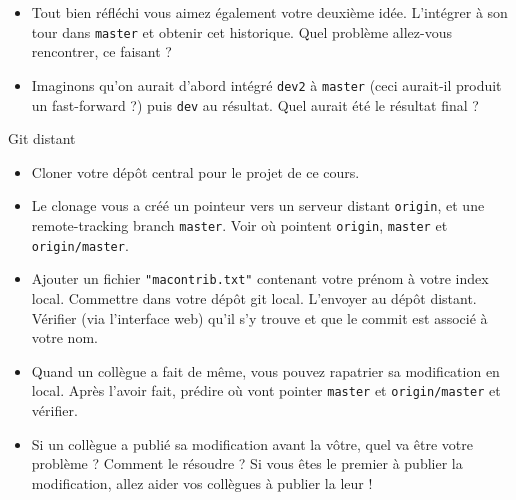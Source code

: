 \documentclass[english, french]{beamer}
\begin{document}
\begin{frame}[allowframebreaks]
\begin{itemize}
{		}
		\item Tout bien réfléchi vous aimez également votre deuxième idée. L’intégrer à son tour dans \texttt{master} et obtenir cet historique. Quel problème allez-vous rencontrer, ce faisant ?\par
		{
			\centering
			\par
		}
		\item Imaginons qu’on aurait d’abord intégré \texttt{dev2} à \texttt{master} (ceci aurait-il produit un fast-forward ?) puis \texttt{dev} au résultat. Quel aurait été le résultat final ?
	\end{itemize}
	Git distant
	\begin{itemize}
		\item Cloner votre dépôt central pour le projet de ce cours.
		\item Le clonage vous a créé un pointeur vers un serveur distant \texttt{origin}, et une \og{}remote-tracking branch\fg{} \texttt{master}. Voir où pointent \texttt{origin}, \texttt{master} et \texttt{origin/master}.
		\item Ajouter un fichier \texttt{"macontrib.txt"} contenant votre prénom à votre index local. Commettre dans votre dépôt git local. L’envoyer au dépôt distant. Vérifier (via l’interface web) qu’il s’y trouve et que le commit est associé à votre nom.
		\item Quand un collègue a fait de même, vous pouvez rapatrier sa modification en local. Après l’avoir fait, prédire où vont pointer \texttt{master} et \texttt{origin/master} et vérifier.
		\item Si un collègue a publié sa modification avant la vôtre, quel va être votre problème ? Comment le résoudre ? Si vous êtes le premier à publier la modification, allez aider vos collègues à publier la leur !
	\end{itemize}
\end{frame}
\end{document}
